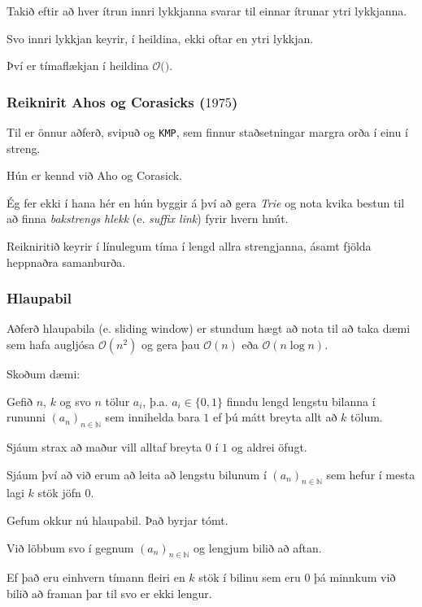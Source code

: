 {
}

{
	{
		\item<1-> Takið eftir að hver ítrun innri lykkjanna svarar til einnar ítrunar ytri lykkjanna.
		\item<2-> Svo innri lykkjan keyrir, í heildina, ekki oftar en ytri lykkjan.
		\item<3-> Því er tímaflækjan í heildina $\mathcal{O}($\onslide<8->{$n + m$}$)$.
	}
}

{
	\frametitle{Reiknirit Ahos og Corasicks ($1975$)}
	{
		\item<1-> Til er önnur aðferð, svipuð og \texttt{KMP}, sem finnur staðsetningar margra orða í einu í streng.
		\item<2-> Hún er kennd við Aho og Corasick.
		\item<3-> Ég fer ekki í hana hér en hún byggir á því að gera \emph{Trie} og
					nota kvika bestun til að finna \emph{bakstrengs hlekk} (e. \emph{suffix link}) fyrir hvern hnút.
		\item<4-> Reikniritið keyrir í línulegum tíma í lengd allra strengjanna, ásamt fjölda heppnaðra samanburða.
	}
}

{
	\frametitle{Hlaupabil}
	{
		\item<1-> Aðferð hlaupabila (e. sliding window) er stundum hægt að nota til að taka
				dæmi sem hafa augljósa $\mathcal{O}(n^2)$ og gera þau $\mathcal{O}(n)$ eða $\mathcal{O}(n\log n)$.
	}
}

{
	{
		\item<1-> Skoðum dæmi:
		\item<2-> Gefið $n$, $k$ og svo $n$ tölur $a_i$, þ.a. $a_i \in \{0, 1\}$ finndu
			lengd lengstu bilanna í rununni $(a_n)_{n \in \mathbb{N}}$ sem innihelda bara $1$ ef þú mátt breyta allt að $k$ tölum.
		\item<3-> Sjáum strax að maður vill alltaf breyta $0$ í $1$ og aldrei öfugt.
		\item<4-> Sjáum því að við erum að leita að lengstu bilunum í $(a_n)_{n \in \mathbb{N}}$ sem hefur í mesta lagi $k$ stök jöfn $0$.
		\item<5-> Gefum okkur nú hlaupabil. Það byrjar tómt.
		\item<6-> Við löbbum svo í gegnum $(a_n)_{n \in \mathbb{N}}$ og lengjum bilið að aftan.
		\item<7-> Ef það eru einhvern tímann fleiri en $k$ stök í bilinu sem eru $0$ þá minnkum við bilið að framan þar til svo er ekki lengur.
	}
}

